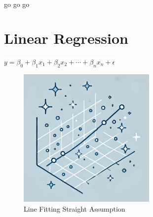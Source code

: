 \documentclass[
  12 pt,
  a4paper,
]{book}
\numberwithin{equation}{section}
\theoremstyle{plain}      %
\theoremstyle{definition} %
\theoremstyle{remark}     %
\theoremstyle{note}         %
\begin{document}
go go go

\hypertarget{linear-regression}{%
\chapter{Linear Regression}\label{linear-regression}}

\begin{center}
\colorbox{white}{\color{navyimpactblue} \huge $y = \beta_0 + \beta_1 x_1 + \beta_2 x_2 + \cdots + \beta_n x_n + \epsilon$}
\end{center}

\hfill\break

\begin{figure}[h!]
  \begin{center}
    \includegraphics[width=0.6\textwidth]{pictures/Whimsical-9-LR.jpeg}
    \caption*{\Large Line Fitting Straight Assumption}
  \end{center}
\end{figure}

\newpage

\vspace*{\fill}
\end{document}
